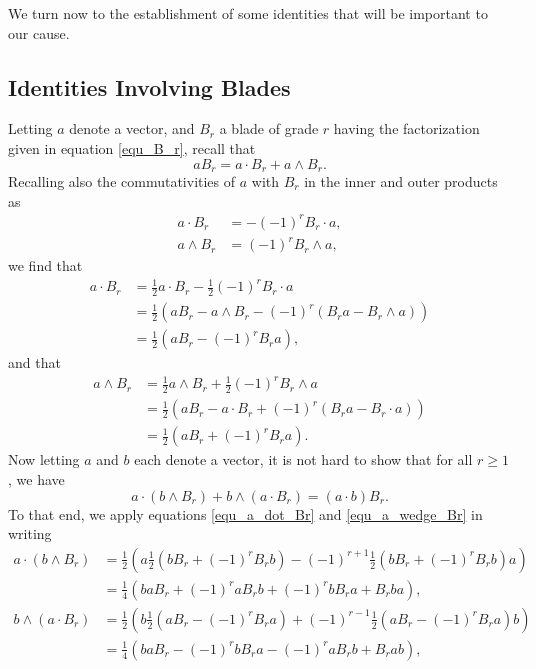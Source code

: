 \documentclass{birkjour}
\theoremstyle{definition}
\theoremstyle{remark}
\numberwithin{equation}{section}
\begin{document}
We turn now to the establishment of some identities that will be important to our cause.

\subsection{Identities Involving Blades}

Letting $a$ denote a vector, and $B_r$ a blade of grade $r$ having the factorization
given in equation \eqref{equ_B_r}, recall that
\begin{equation}\label{equ_aBr_is_a_dot_Br_and_a_wedge_Br}
aB_r = a\cdot B_r + a\wedge B_r.
\end{equation}
Recalling also the commutativities of $a$ with $B_r$ in the inner and outer products as
\begin{align}
a\cdot B_r &= -(-1)^r B_r\cdot a,\label{equ_a_dot_Br_commutativity} \\
a\wedge B_r &= (-1)^r B_r\wedge a,\label{equ_a_wedge_Br_commutativity}
\end{align}
we find that
\begin{align}
a\cdot B_r &= \frac{1}{2}a\cdot B_r - \frac{1}{2}(-1)^r B_r\cdot a\nonumber \\
 &= \frac{1}{2}(aB_r - a\wedge B_r - (-1)^r(B_ra - B_r\wedge a))\nonumber \\
 &= \frac{1}{2}(aB_r-(-1)^rB_ra),\label{equ_a_dot_Br}
\end{align}
and that
\begin{align}
a\wedge B_r &= \frac{1}{2}a\wedge B_r + \frac{1}{2}(-1)^r B_r\wedge a\nonumber \\
 &= \frac{1}{2}(aB_r - a\cdot B_r + (-1)^r(B_ra - B_r\cdot a))\nonumber \\
 &= \frac{1}{2}(aB_r+(-1)^rB_ra).\label{equ_a_wedge_Br}
\end{align}
Now letting $a$ and $b$ each denote a vector, it is not hard to show that for all $r\geq 1$, we have
\begin{equation}\label{equ_a_dot_b_wedge_Br_identity}
a\cdot(b\wedge B_r) + b\wedge(a\cdot B_r) = (a\cdot b)B_r.
\end{equation}
To that end, we apply equations \eqref{equ_a_dot_Br} and \eqref{equ_a_wedge_Br} in writing
\begin{align*}
a\cdot(b\wedge B_r)
 &= \frac{1}{2}\left(a\frac{1}{2}\left(bB_r + (-1)^rB_rb\right)-(-1)^{r+1}\frac{1}{2}\left(bB_r+(-1)^rB_rb\right)a\right) \\
 &= \frac{1}{4}\left(baB_r + (-1)^raB_rb + (-1)^rbB_ra + B_rba\right), \\
b\wedge(a\cdot B_r)
 &= \frac{1}{2}\left(b\frac{1}{2}\left(aB_r-(-1)^rB_ra\right)+(-1)^{r-1}\frac{1}{2}\left(aB_r-(-1)^rB_ra\right)b\right) \\
 &= \frac{1}{4}\left(baB_r - (-1)^rbB_ra - (-1)^raB_rb + B_rab\right),
\end{align*}
\end{document}
